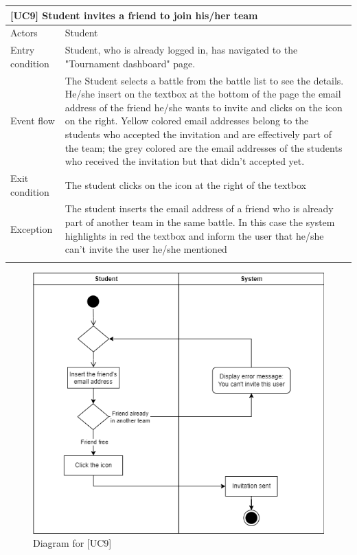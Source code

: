 \documentclass[12pt,oneside,a4paper]{article}
\begin{document}
\begin{table}[htbp]
\begin{tabular}{|l|p{12cm}|}
    \hline
    \multicolumn{2}{|l|}{\textbf{[UC9] Student invites a friend to join his/her team}}\\
    \hline
    Actors & Student\\
    \hline
    Entry condition & Student, who is already logged in, has navigated to the "Tournament dashboard" page.\\
    \hline
    Event flow & The Student selects a battle from the battle list to see the details. He/she insert on the textbox at the bottom of the page the email address of the friend he/she wants to invite and clicks on the icon on the right. Yellow colored email addresses belong to the students who accepted the invitation and are effectively part of the team; the grey colored are the email addresses of the students who received the invitation but that didn't accepted yet.\\
    \hline
    Exit condition & The student clicks on the icon at the right of the textbox\\
    \hline
    Exception & The student inserts the email address of a friend who is already part of another team in the same battle. In this case the system highlights in red the textbox and inform the user that he/she can't invite the user he/she mentioned\\
    \lasthline
\end{tabular}
\end{table}

\clearpage

\begin{figure}
    \centering
    \includegraphics[width=1\linewidth]{Images//Diagrams/StudentInvitesFriend.png}
    \caption{Diagram for [UC9]}
    \label{fig:enter-label}
\end{figure}
\end{document}
